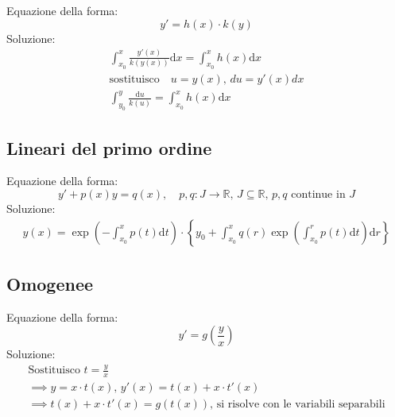 \documentclass[a4paper]{article}
\newcommand{\numberset}{\mathbb}
\newcommand{\R}{\numberset{R}}
\theoremstyle{plain}
\begin{document}
Equazione della forma:
\begin{equation*}
    y'=h(x)\cdot k(y)
\end{equation*}
Soluzione:
\begin{gather*}
    \int_{x_0}^x{\frac{y'(x)}{k(y(x))}\text{d}x}=\int_{x_0}^{x}{h(x)\text{d}x}\\
    \text{sostituisco}\quad u=y(x),\, du=y'(x)dx\\
    \int_{y_0}^y{\frac{\text{d}u}{k(u)}}=\int_{x_0}^{x}{h(x)\text{d}x}
\end{gather*}

\subsection{Lineari del primo ordine}

Equazione della forma:
\begin{equation*}
    y'+p(x)y=q(x),\quad p,q\colon J\to\R,\,J\subseteq\R,\, p,q\text{ continue in }J
\end{equation*}
Soluzione:
\begin{gather*}
    y(x)=\exp \left( -\int_{x_0}^x{p(t)\text{d}t} \right) \cdot
    \left\{ y_0+\int_{x_0}^{x}{q(r)\exp \left(\int_{x_0}^r{p(t)\text{d}t}\right) \text{d}r} \right\}
\end{gather*}

\subsection{Omogenee}

Equazione della forma:
\begin{equation*}
    y'=g\left(\frac{y}{x}\right)    
\end{equation*}
Soluzione: 
\begin{gather*}
    \text{Sostituisco }t=\frac{y}{x}\\
    \implies y=x\cdot t(x),\,y'(x)=t(x)+x\cdot t'(x)\\
    \implies t(x)+x\cdot t'(x)=g(t(x)),\,\text{si risolve con le variabili separabili}
\end{gather*}
\end{document}

